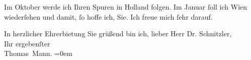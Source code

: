\pstart
           Im Oktober werde ich Ihren Spuren in Holland folgen. Im Januar{ }ſoll ich Wien
               wiederſehen und damit,{ }ſo hoffe ich, Sie. Ich freue mich{ }ſehr darauf.\pend
           
\pstart
           In herzlicher Ehrerbietung Sie grüßend bin ich, lieber Herr Dr.
               Schnitzler,{\\[\baselineskip]}Ihr ergebenſter{\\[\baselineskip]}\spacefill\mbox{Thomas Mann.}\pend
           \leftskip=0em{}\endnumbering{}  \newcommand{\dateiname}{L02392}\newcommand{\titel}{Thomas Mann an Arthur Schnitzler, 4. 9. 1922}\newcommand{\editorInnen}{Martin Anton Müller und Gerd-Hermann Susen}
